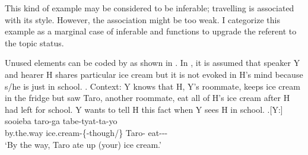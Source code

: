 This kind of example may be considered to be inferable;
travelling is associated with its style.
However, the association might be too weak.
I categorize this example as a marginal case of inferable
and  functions to upgrade the referent to the topic status.

Unused elements can be coded by 
as shown in \Next.
In \Next,
it is assumed that speaker Y and hearer H shares particular ice cream
but it is not evoked in H's mind
because s/he is just in school.
%
\ex. \label{aisuT}Context: Y knows that H, Y's roommate, keeps ice cream in the fridge
	but saw Taro, another roommate, eat all of H's ice cream after H had left for school.
	Y wants to tell H this fact when Y sees H in school.
	\ag.[Y:] sooieba  taro-ga tabe-tyat-ta-yo \\
		by.the.way ice.cream-\{-though/\} Taro- eat--- \\
		`By the way, Taro ate up (your) ice cream.'


%		


